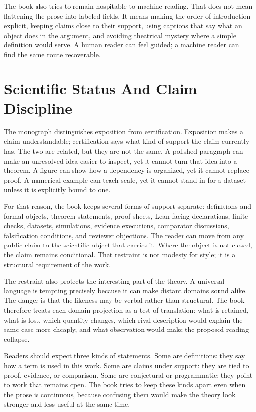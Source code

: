 \documentclass[11pt,a4paper,openany]{book}
\begin{document}
The book also tries to remain hospitable to machine reading. That does not mean flattening the prose into labeled fields. It means making the order of introduction explicit, keeping claims close to their support, using captions that say what an object does in the argument, and avoiding theatrical mystery where a simple definition would serve. A human reader can feel guided; a machine reader can find the same route recoverable.\par
\section*{Scientific Status And Claim Discipline}
The monograph distinguishes exposition from certification. Exposition makes a claim understandable; certification says what kind of support the claim currently has. The two are related, but they are not the same. A polished paragraph can make an unresolved idea easier to inspect, yet it cannot turn that idea into a theorem. A figure can show how a dependency is organized, yet it cannot replace proof. A numerical example can teach scale, yet it cannot stand in for a dataset unless it is explicitly bound to one.\par
For that reason, the book keeps several forms of support separate: definitions and formal objects, theorem statements, proof sheets, Lean-facing declarations, finite checks, datasets, simulations, evidence executions, comparator discussions, falsification conditions, and reviewer objections. The reader can move from any public claim to the scientific object that carries it. Where the object is not closed, the claim remains conditional. That restraint is not modesty for style; it is a structural requirement of the work.\par
The restraint also protects the interesting part of the theory. A universal language is tempting precisely because it can make distant domains sound alike. The danger is that the likeness may be verbal rather than structural. The book therefore treats each domain projection as a test of translation: what is retained, what is lost, which quantity changes, which rival description would explain the same case more cheaply, and what observation would make the proposed reading collapse.\par
Readers should expect three kinds of statements. Some are definitions: they say how a term is used in this work. Some are claims under support: they are tied to proof, evidence, or comparison. Some are conjectural or programmatic: they point to work that remains open. The book tries to keep these kinds apart even when the prose is continuous, because confusing them would make the theory look stronger and less useful at the same time.\par
\end{document}
